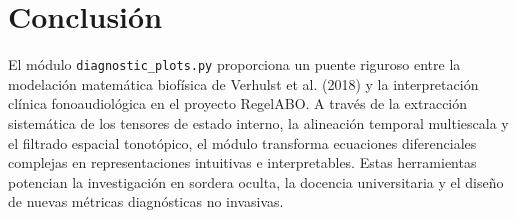 \documentclass[12pt,a4paper]{article}
\begin{document}
\section{Conclusión}

El módulo \texttt{diagnostic\_plots.py} proporciona un puente riguroso entre la modelación matemática biofísica de Verhulst et al. (2018) y la interpretación clínica fonoaudiológica en el proyecto RegelABO. A través de la extracción sistemática de los tensores de estado interno, la alineación temporal multiescala y el filtrado espacial tonotópico, el módulo transforma ecuaciones diferenciales complejas en representaciones intuitivas e interpretables. Estas herramientas potencian la investigación en sordera oculta, la docencia universitaria y el diseño de nuevas métricas diagnósticas no invasivas.
\end{document}
